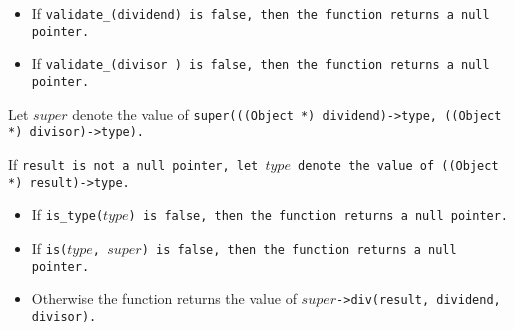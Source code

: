 \begin{itemize}

\item If \tt{validate_(dividend)} is \tt{false},
then the function returns a null pointer.

\item If \tt{validate_(divisor )} is \tt{false},
then the function returns a null pointer.

\end{itemize}

Let $super$ denote the value of
\tt{super(((Object *) dividend)->type, ((Object *) divisor)->type)}.

If \tt{result} is not a null pointer, let $type$
denote the value of \tt{((Object *) result)->type}.

\begin{itemize}

\item If \tt{is_type(}$type$\tt{)} is \tt{false},
then the function returns a null pointer.

\item If \tt{is(}$type$\tt{,} $super$\tt{)} is \tt{false},
then the function returns a null pointer.

\item Otherwise the function returns the value
of $super$\tt{->div(result, dividend, divisor)}.

\end{itemize}
